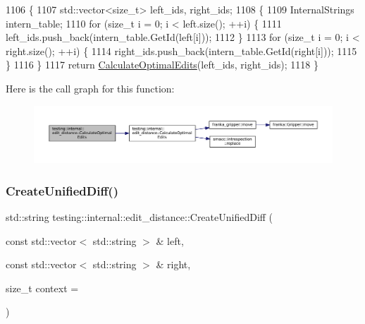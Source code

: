 \begin{DoxyCode}
1106                                        \{
1107   std::vector<size\_t> left\_ids, right\_ids;
1108   \{
1109     InternalStrings intern\_table;
1110     \textcolor{keywordflow}{for} (\textcolor{keywordtype}{size\_t} i = 0; i < left.size(); ++i) \{
1111       left\_ids.push\_back(intern\_table.GetId(left[i]));
1112     \}
1113     \textcolor{keywordflow}{for} (\textcolor{keywordtype}{size\_t} i = 0; i < right.size(); ++i) \{
1114       right\_ids.push\_back(intern\_table.GetId(right[i]));
1115     \}
1116   \}
1117   \textcolor{keywordflow}{return} \hyperlink{namespacetesting_1_1internal_1_1edit__distance_a26323b4c2a29ea8e187aafbd4d2275db}{CalculateOptimalEdits}(left\_ids, right\_ids);
1118 \}
\end{DoxyCode}
Here is the call graph for this function\+:
\nopagebreak
\begin{figure}[H]
\begin{center}
\leavevmode
\includegraphics[width=350pt]{namespacetesting_1_1internal_1_1edit__distance_a32267b2ae24de1de175ac8217406877d_cgraph}
\end{center}
\end{figure}
\mbox{\label{namespacetesting_1_1internal_1_1edit__distance_ac4c24a581ff433d7aca7ed12c9133fb1}} 
\subsubsection{\texorpdfstring{Create\+Unified\+Diff()}{CreateUnifiedDiff()}}
{\footnotesize\ttfamily std\+::string testing\+::internal\+::edit\+\_\+distance\+::\+Create\+Unified\+Diff (\begin{DoxyParamCaption}\item[{const std\+::vector$<$ std\+::string $>$ \&}]{left,  }\item[{const std\+::vector$<$ std\+::string $>$ \&}]{right,  }\item[{size\+\_\+t}]{context = {} }\end{DoxyParamCaption})}



